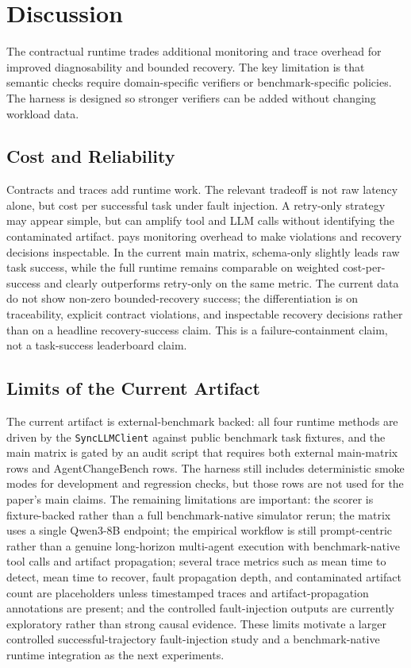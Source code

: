 \section{Discussion}

The contractual runtime trades additional monitoring and trace overhead for improved diagnosability and bounded recovery. The key limitation is that semantic checks require domain-specific verifiers or benchmark-specific policies. The harness is designed so stronger verifiers can be added without changing workload data.

\subsection{Cost and Reliability}

Contracts and traces add runtime work. The relevant tradeoff is not raw latency alone, but cost per successful task under fault injection. A retry-only strategy may appear simple, but can amplify tool and LLM calls without identifying the contaminated artifact. \system pays monitoring overhead to make violations and recovery decisions inspectable. In the current main matrix, schema-only slightly leads raw task success, while the full runtime remains comparable on weighted cost-per-success and clearly outperforms retry-only on the same metric. The current data do not show non-zero bounded-recovery success; the differentiation is on traceability, explicit contract violations, and inspectable recovery decisions rather than on a headline recovery-success claim. This is a failure-containment claim, not a task-success leaderboard claim.

\subsection{Limits of the Current Artifact}

The current artifact is external-benchmark backed: all four runtime methods are driven by the \texttt{SyncLLMClient} against public benchmark task fixtures, and the main matrix is gated by an audit script that requires both external main-matrix rows and AgentChangeBench rows. The harness still includes deterministic smoke modes for development and regression checks, but those rows are not used for the paper's main claims. The remaining limitations are important: the scorer is fixture-backed rather than a full benchmark-native simulator rerun; the matrix uses a single Qwen3-8B endpoint; the empirical workflow is still prompt-centric rather than a genuine long-horizon multi-agent execution with benchmark-native tool calls and artifact propagation; several trace metrics such as mean time to detect, mean time to recover, fault propagation depth, and contaminated artifact count are placeholders unless timestamped traces and artifact-propagation annotations are present; and the controlled fault-injection outputs are currently exploratory rather than strong causal evidence. These limits motivate a larger controlled successful-trajectory fault-injection study and a benchmark-native runtime integration as the next experiments.

